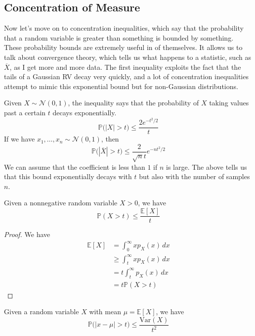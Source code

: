 \documentclass{article}
\begin{document}
  \subsection{Concentration of Measure}

    Now let's move on to concentration inequalities, which say that the probability that a random variable is greater than something is bounded by something. These probability bounds are extremely useful in of themselves. It allows us to talk about convergence theory, which tells us what happens to a statistic, such as $\overline{X}$, as I get more and more data. The first inequality exploits the fact that the tails of a Gaussian RV decay very quickly, and a lot of concentration inequalities attempt to mimic this exponential bound but for non-Gaussian distributions. 

    \begin{theorem}
    Given $X \sim \mathcal{N}(0, 1)$, the inequality says that the probability of $X$ taking values past a certain $t$ decays exponentially. 
    \[\mathbb{P} \big( |X| > t \big) \leq \frac{2 e^{-t^2/2}}{t}\]
    If we have $x_1, \ldots, x_n \sim \mathcal{N}(0, 1)$, then 
    \[\mathbb{P} \big( |\overline{X}| > t \big) \leq \frac{2}{\sqrt{n} t} e^{-n t^2/2}\]
    We can assume that the coefficient is less than $1$ if $n$ is large. The above tells us that this bound exponentially decays with $t$ but also with the number of samples $n$. 
    \end{theorem}

    \begin{theorem}
    Given a nonnegative random variable $X > 0$, we have 
    \[\mathbb{P}(X > t) \leq \frac{\mathbb{E}[X]}{t}\]
    \end{theorem}
    \begin{proof}
    We have 
    \begin{align*}
        \mathbb{E}[X] & = \int_0^\infty x p_X (x)\,dx \\
        & \geq \int_t^\infty x p_X (x) \,dx \\
        & = t \int_t^\infty p_X (x) \,dx \\
        & = t \mathbb{P}(X > t)
    \end{align*}
    \end{proof}

    \begin{theorem}
    Given a random variable $X$ with mean $\mu = \mathbb{E}[X]$, we have 
    \[\mathbb{P}\big( |x - \mu| > t\big) \leq \frac{\mathrm{Var}(X)}{t^2}\]
    \end{theorem}
\end{document}
